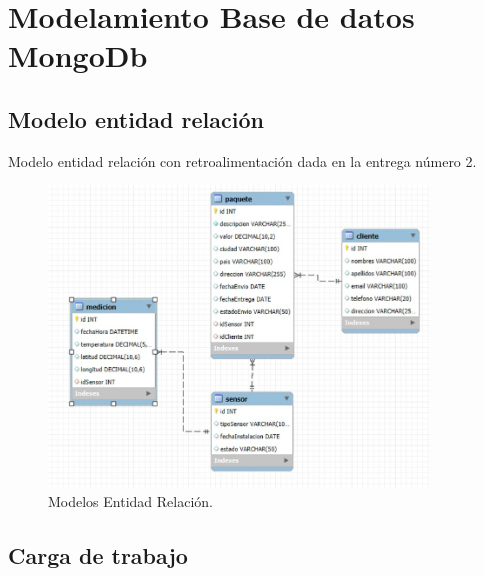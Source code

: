\section{Modelamiento Base de datos MongoDb}

\subsection{Modelo entidad relación}
Modelo entidad relación con retroalimentación dada en la entrega número 2.

\begin{figure}[H]
  \centering
  \includegraphics[width=0.9\textwidth]{Figures/1. Content/Modelo_ER.jpeg}
  \caption{Modelos Entidad Relación.}
  \label{fig:Modelo_ER}
\end{figure}

\subsection{Carga de trabajo}

